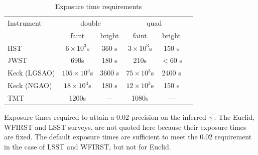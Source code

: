 \documentclass[a4paper,11pt]{article}
\begin{document}
\begin{table}\footnotesize
\begin{center}
\caption{Exposure time requirements}
\begin{tabular}{lccccc|}
\hline \hline
Instrument & \multicolumn{2}{c}{double} & \multicolumn{2}{c}{quad} \\
  & faint  & bright &  faint  &  bright \\
\hline
  HST   & $6\times10^3$s & 360 s  & $3\times10^3$s & 150 s \\
  JWST   & $690$s & 180 s  & $210$s & $<$60 s \\
  Keck (LGSAO)   & $105\times10^3$s & 3600 s  & $75\times10^3$s & 2400 s \\
  Keck (NGAO)   & $18\times10^3$s & 180 s  & $12\times10^3$s & 150 s \\
  TMT   &  1200s  &  ---   &   1080s   &  ---  \\
\hline
\hline
\end{tabular}
\begin{tablenotes}
\item
Exposure times required to attain a 0.02 precision on the inferred $\gamma^\prime.$
 The Euclid, WFIRST and LSST surveys, are not quoted here because their exposure times are fixed. The default exposure times are sufficient to meet the 0.02 requirement in the case of LSST and WFIRST, but not for Euclid.\\
\end{tablenotes}
\label{tab:exptimes}
\end{center}
\end{table}
\end{document}
